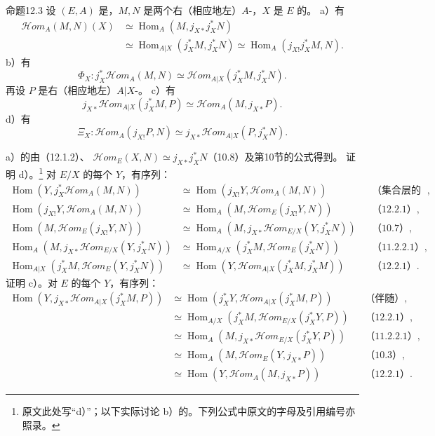 \begin{SGAresult}{命题}{12.3}
设 $(E,A)$ 是，$M,N$ 是两个右（相应地左）$A$-，$X$ 是 $E$ 的。
a）有
\begin{align*}
\mathscr{H}\!om_A(M,N)(X)&\simeq\operatorname{Hom}_A(M,j_{X*}j_X^*N)\\
&\simeq\operatorname{Hom}_{A|X}(j_X^*M,j_X^*N)\simeq\operatorname{Hom}_A(j_{X!}j_X^*M,N).
\end{align*}
b）有
\[\Phi_X:j_X^*\mathscr{H}\!om_A(M,N)\simeq\mathscr{H}\!om_{A|X}(j_X^*M,j_X^*N).\]
再设 $P$ 是右（相应地左）$A|X$-。
c）有
\[j_{X*}\mathscr{H}\!om_{A|X}(j_X^*M,P)\simeq\mathscr{H}\!om_A(M,j_{X*}P).\]
d）有
\[\Xi_X:\mathscr{H}\!om_A(j_{X!}P,N)\simeq j_{X*}\mathscr{H}\!om_{A|X}(P,j_X^*N).\]
\end{SGAresult}
a）的由（12.1.2）、 $\mathscr{H}\!om_E(X,N)\simeq j_{X*}j_X^*N$（10.8）及第10节的公式得到。
证明 d）。\footnote{原文此处写“d）”；以下实际讨论 b）的。下列公式中原文的字母及引用编号亦照录。}
对 $E/X$ 的每个 $Y$，有序列：
\begin{align*}
\operatorname{Hom}(Y,j_X^*\mathscr{H}\!om_A(M,N))
&\simeq\operatorname{Hom}(j_{X!}Y,\mathscr{H}\!om_A(M,N))&&\text{（集合层的伴随）},\\
\operatorname{Hom}(j_{X!}Y,\mathscr{H}\!om_A(M,N))
&\simeq\operatorname{Hom}_A(M,\mathscr{H}\!om_E(j_{X!}Y,N))&&\text{（12.2.1）},\\
\operatorname{Hom}(M,\mathscr{H}\!om_E(j_{X!}Y,N))
&\simeq\operatorname{Hom}_A(M,j_{X*}\mathscr{H}\!om_{E/X}(Y,j_X^*N))&&\text{（10.7）},\\
\operatorname{Hom}_A(M,j_{X*}\mathscr{H}\!om_{E/X}(Y,j_X^*N))
&\simeq\operatorname{Hom}_{A/X}(j_X^*M,\mathscr{H}\!om_E(j_X^*N))&&\text{（11.2.2.1）},\\
\operatorname{Hom}_{A|X}(j_X^*M,\mathscr{H}\!om_E(Y,j_X^*N))
&\simeq\operatorname{Hom}(Y,\mathscr{H}\!om_{A|X}(j_X^*M,j_X^*M))&&\text{（12.2.1）}.
\end{align*}
证明 c）。对 $E$ 的每个 $Y$，有序列：
\begin{align*}
\operatorname{Hom}(Y,j_{X*}\mathscr{H}\!om_{A|X}(j_X^*M,P))
&\simeq\operatorname{Hom}(j_X^*Y,\mathscr{H}\!om_{A|X}(j_X^*M,P))&&\text{（伴随）},\\
&\simeq\operatorname{Hom}_{A/X}(j_X^*M,\mathscr{H}\!om_{E/X}(j_X^*Y,P))&&\text{（12.2.1）},\\
&\simeq\operatorname{Hom}_A(M,j_{X*}\mathscr{H}\!om_{E/X}(j_X^*Y,P))&&\text{（11.2.2.1）},\\
&\simeq\operatorname{Hom}_A(M,\mathscr{H}\!om_E(Y,j_{X*}P))&&\text{（10.3）},\\
&\simeq\operatorname{Hom}(Y,\mathscr{H}\!om_A(M,j_{X*}P))&&\text{（12.2.1）}.
\end{align*}
